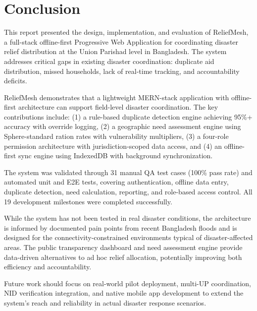 \chapter{Conclusion}

This report presented the design, implementation, and evaluation of ReliefMesh, a full-stack offline-first Progressive Web Application for coordinating disaster relief distribution at the Union Parishad level in Bangladesh. The system addresses critical gaps in existing disaster coordination: duplicate aid distribution, missed households, lack of real-time tracking, and accountability deficits.

ReliefMesh demonstrates that a lightweight MERN-stack application with offline-first architecture can support field-level disaster coordination. The key contributions include: (1) a rule-based duplicate detection engine achieving 95\%+ accuracy with override logging, (2) a geographic need assessment engine using Sphere-standard ration rates with vulnerability multipliers, (3) a four-role permission architecture with jurisdiction-scoped data access, and (4) an offline-first sync engine using IndexedDB with background synchronization.

The system was validated through 31 manual QA test cases (100\% pass rate) and automated unit and E2E tests, covering authentication, offline data entry, duplicate detection, need calculation, reporting, and role-based access control. All 19 development milestones were completed successfully.

While the system has not been tested in real disaster conditions, the architecture is informed by documented pain points from recent Bangladesh floods and is designed for the connectivity-constrained environments typical of disaster-affected areas. The public transparency dashboard and need assessment engine provide data-driven alternatives to ad hoc relief allocation, potentially improving both efficiency and accountability.

Future work should focus on real-world pilot deployment, multi-UP coordination, NID verification integration, and native mobile app development to extend the system's reach and reliability in actual disaster response scenarios.
